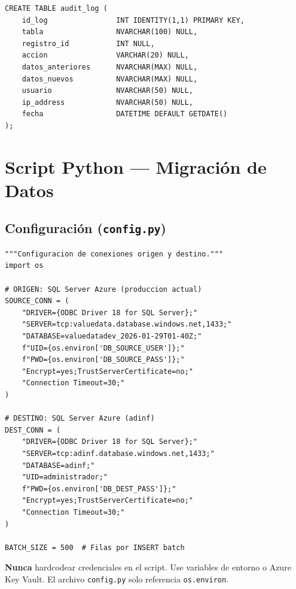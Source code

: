 \documentclass[12pt,a4paper,twoside]{report}
\begin{document}
\begin{lstlisting}[style=sqlstyle, caption={audit\_log}]
CREATE TABLE audit_log (
    id_log                INT IDENTITY(1,1) PRIMARY KEY,
    tabla                 NVARCHAR(100) NULL,
    registro_id           INT NULL,
    accion                VARCHAR(20) NULL,
    datos_anteriores      NVARCHAR(MAX) NULL,
    datos_nuevos          NVARCHAR(MAX) NULL,
    usuario               NVARCHAR(50) NULL,
    ip_address            NVARCHAR(50) NULL,
    fecha                 DATETIME DEFAULT GETDATE()
);
\end{lstlisting}

\chapter{Script Python --- Migraci\'on de Datos}

\section{Configuraci\'on (\texttt{config.py})}

\begin{lstlisting}[style=pythonstyle, caption={config.py --- Connection strings}]
"""Configuracion de conexiones origen y destino."""
import os

# ORIGEN: SQL Server Azure (produccion actual)
SOURCE_CONN = (
    "DRIVER={ODBC Driver 18 for SQL Server};"
    "SERVER=tcp:valuedata.database.windows.net,1433;"
    "DATABASE=valuedatadev_2026-01-29T01-40Z;"
    f"UID={os.environ['DB_SOURCE_USER']};"
    f"PWD={os.environ['DB_SOURCE_PASS']};"
    "Encrypt=yes;TrustServerCertificate=no;"
    "Connection Timeout=30;"
)

# DESTINO: SQL Server Azure (adinf)
DEST_CONN = (
    "DRIVER={ODBC Driver 18 for SQL Server};"
    "SERVER=tcp:adinf.database.windows.net,1433;"
    "DATABASE=adinf;"
    "UID=administrador;"
    f"PWD={os.environ['DB_DEST_PASS']};"
    "Encrypt=yes;TrustServerCertificate=no;"
    "Connection Timeout=30;"
)

BATCH_SIZE = 500  # Filas por INSERT batch
\end{lstlisting}

\begin{dangerbox}
\textbf{Nunca} hardcodear credenciales en el script. Use variables de entorno o Azure Key Vault. El archivo \texttt{config.py} solo referencia \texttt{os.environ}.
\end{dangerbox}
\end{document}
